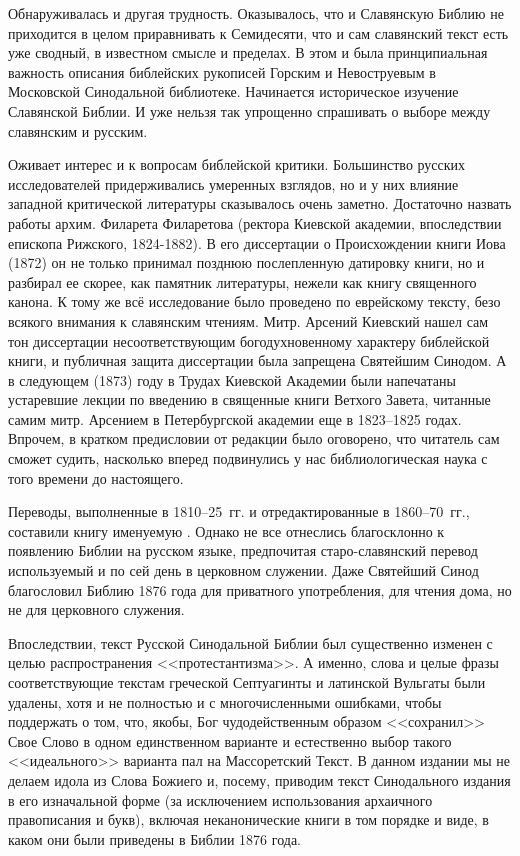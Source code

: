 Обнаруживалась и другая трудность.
Оказывалось, что и Славянскую Библию не приходится в целом приравнивать
к Семидесяти, что и сам славянский текст есть уже сводный, в известном
смысле и пределах.
В этом и была принципиальная важность описания библейских рукописей Горским
и Невоструевым в Московской Синодальной библиотеке.
Начинается историческое изучение Славянской Библии.
И уже нельзя так упрощенно спрашивать о выборе между славянским и русским.  

Оживает интерес и к вопросам библейской критики.
Большинство русских исследователей придерживались умеренных
взглядов, но и у них влияние западной критической
литературы сказывалось очень заметно.
Достаточно назвать работы архим. Филарета Филаретова (ректора
Киевской академии, впоследствии епископа Рижского, 1824-1882).
В его диссертации о Происхождении книги Иова (1872) он не только
принимал позднюю послепленную датировку книги, но и разбирал ее скорее,
как памятник литературы, нежели как книгу священного канона.
К тому же всё исследование было проведено по еврейскому тексту,
безо всякого внимания к славянским чтениям.
Митр. Арсений Киевский нашел сам тон диссертации
несоответствующим богодухновенному характеру библейской книги, и
публичная защита диссертации была запрещена Святейшим Синодом.
А в следующем (1873) году в Трудах Киевской Академии были
напечатаны устаревшие лекции по введению в священные книги
Ветхого Завета, читанные самим митр. Арсением в Петербургской
академии еще в 1823--1825 годах.
Впрочем, в кратком предисловии от редакции было оговорено, что
читатель сам сможет судить, насколько вперед подвинулись у нас
библиологическая наука с того времени до настоящего.

Переводы, выполненные в 1810--25~гг. и отредактированные
в 1860--70~гг., составили книгу именуемую .
Однако не все отнеслись благосклонно к появлению Библии на русском языке,
предпочитая старо-славянский перевод используемый и по сей день в церковном служении.
Даже Святейший Синод благословил Библию 1876 года 
для приватного употребления, для чтения дома, но не для церковного служения.

Впоследствии, текст Русской Синодальной Библии был существенно изменен
с целью распространения <<протестантизма>>.
А именно, слова и целые фразы соответствующие текстам греческой
Септуагинты и латинской Вульгаты были удалены, хотя и не полностью и
с многочисленными ошибками, чтобы поддержать  о том, что,
якобы, Бог чудодейственным образом <<сохранил>> Свое
Слово в одном единственном варианте и естественно выбор такого
<<идеального>> варианта пал на Массоретский Текст.
В данном издании мы не делаем идола из Слова Божиего и, посему,
приводим текст Синодального издания в его изначальной форме (за исключением
использования архаичного правописания и букв), включая неканонические
книги в том порядке и виде, в каком они были приведены в Библии 1876 года.

